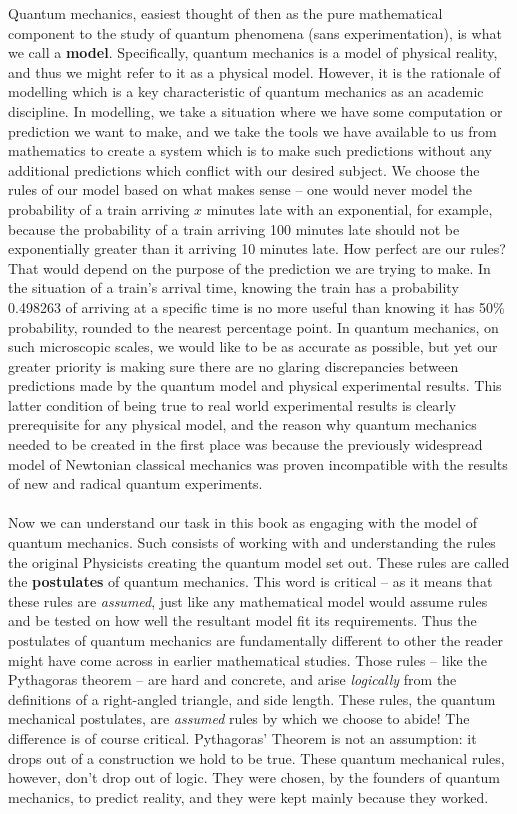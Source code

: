 Quantum mechanics, easiest thought of then as the pure mathematical component to the study of quantum phenomena (sans experimentation), is what we call a \textbf{model}. Specifically, quantum mechanics is a model of physical reality, and thus we might refer to it as a physical model. However, it is the rationale of modelling which is a key characteristic of quantum mechanics as an academic discipline. In modelling, we take a situation where we have some computation or prediction we want to make, and we take the tools we have available to us from mathematics to create a system which is to make such predictions without any additional predictions which conflict with our desired subject. We choose the rules of our model based on what makes sense -- one would never model the probability of a train arriving $x$ minutes late with an exponential, for example, because the probability of a train arriving 100 minutes late should not be exponentially greater than it arriving 10 minutes late. How perfect are our rules? That would depend on the purpose of the prediction we are trying to make. In the situation of a train's arrival time, knowing the train has a probability 0.498263 of arriving at a specific time is no more useful than knowing it has 50\% probability, rounded to the nearest percentage point. In quantum mechanics, on such microscopic scales, we would like to be as accurate as possible, but yet our greater priority is making sure there are no glaring discrepancies between predictions made by the quantum model and physical experimental results. This latter condition of being true to real world experimental results is clearly prerequisite for any physical model, and the reason why quantum mechanics needed to be created in the first place was because the previously widespread model of Newtonian classical mechanics was proven incompatible with the results of new and radical quantum experiments.
\\\\
Now we can understand our task in this book as engaging with the model of quantum mechanics. Such consists of working with and understanding the rules the original Physicists creating the quantum model set out. These rules are called the \textbf{postulates} of quantum mechanics. This word  is critical -- as it means that these rules are \textit{assumed}, just like any mathematical model would assume rules and be tested on how well the resultant model fit its requirements. Thus the postulates of quantum mechanics are fundamentally different to other  the reader might have come across in earlier mathematical studies. Those rules -- like the Pythagoras theorem -- are hard and concrete, and arise \textit{logically} from the definitions of a right-angled triangle, and side length. These rules, the quantum mechanical postulates, are \textit{assumed} rules by which we choose to abide! The difference is of course critical. Pythagoras' Theorem is not an assumption: it drops out of a construction we hold to be true. These quantum mechanical rules, however, don't drop out of logic. They were chosen, by the founders of quantum mechanics, to predict reality, and they were kept mainly because they worked.
